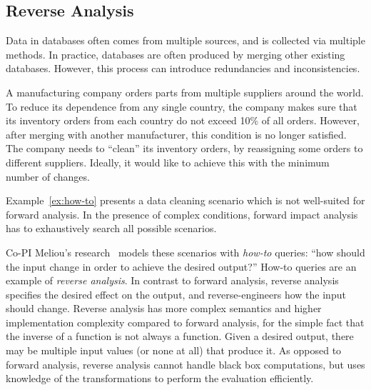 


\subsection{Reverse Analysis} %
\label{sub:reverse_analysis}
Data in databases often comes from multiple sources, and is collected via multiple methods.
In practice, databases are often produced by merging other existing databases. However, this process can introduce redundancies and inconsistencies.

\begin{example}\label{ex:how-to}
	A manufacturing company orders parts from multiple suppliers around the world. To reduce its dependence from any single country, the company makes sure that its inventory orders from each country do not exceed 10\% of all orders. However, after merging with another manufacturer, this condition is no longer satisfied. The company needs to ``clean'' its inventory orders, by reassigning some orders to different suppliers. Ideally, it would like to achieve this with the minimum number of changes.
\end{example}

Example~\ref{ex:how-to} presents a data cleaning scenario which is not well-suited for forward analysis. In the presence of complex conditions, forward impact analysis has to exhaustively search all possible scenarios.

Co-PI Meliou's research~\cite{DBLP:journals/pvldb/MeliouGS11} models these scenarios with \emph{how-to} queries: ``how should the input change in order to achieve the desired output?'' How-to queries are an example of \emph{reverse analysis}. In contrast to forward analysis,  reverse analysis specifies the desired effect on the output, and reverse-engineers how the input should change. Reverse analysis has more complex semantics and higher implementation complexity compared to forward analysis, for the simple fact that the inverse of a function is not always a function. Given a desired output, there may be multiple input values (or none at all) that produce it. 
As opposed to forward analysis, reverse analysis cannot handle black box computations, but uses knowledge of the transformations to perform the evaluation efficiently.

